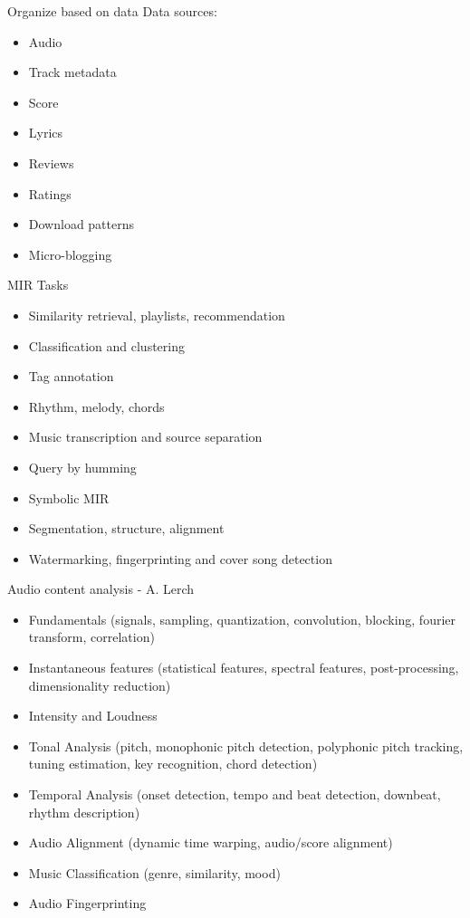 \documentclass[12pt]{beamer}
\begin{document}
\begin{frame}{Organize based on data}
Data sources: 
\begin{itemize} 
\item{Audio}
\item{Track metadata}
\item{Score} 
\item{Lyrics} 
\item{Reviews} 
\item{Ratings} 
\item{Download patterns} 
\item{Micro-blogging}
\end{itemize} 
\end{frame} 


\begin{frame}{MIR Tasks} 
\begin{itemize} 
\item{Similarity retrieval, playlists, recommendation} 
\item{Classification and clustering} 
\item{Tag annotation}
\item{Rhythm, melody, chords}
\item{Music transcription and source separation} 
\item{Query by humming} 
\item{Symbolic MIR} 
 \item{Segmentation, structure, alignment} 
\item{Watermarking, fingerprinting and cover song detection} 
\end{itemize} 
\end{frame} 





\begin{frame}{Audio content analysis - A. Lerch}

  \begin{itemize}
  \item{Fundamentals (signals, sampling, quantization, convolution, blocking, fourier transform, correlation)}
  \item{Instantaneous features (statistical features, spectral features, post-processing, dimensionality reduction)}
    \item{Intensity and Loudness}
    \item{Tonal Analysis (pitch, monophonic pitch detection, polyphonic pitch tracking, tuning estimation, key recognition, chord detection)}
    \item{Temporal Analysis (onset detection, tempo and beat detection, downbeat, rhythm description)}
    \item{Audio Alignment (dynamic time warping, audio/score alignment)}
    \item{Music  Classification (genre, similarity, mood)}
      \item{Audio Fingerprinting}
    \end{itemize}
\end{frame} 
\end{document}
